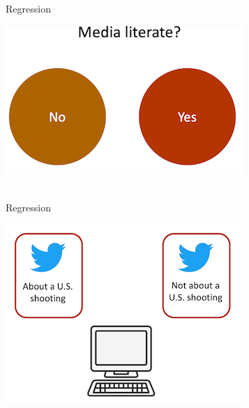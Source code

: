 \documentclass[handout]{beamer}
\begin{document}
\begin{frame}{Regression}
	
	\begin{center}
		\includegraphics{../pictures/medialiteracydummy.png} \\\
	\end{center}
	
	
	
	
	
\end{frame}


\begin{frame}{Regression}
	
	\begin{center}
		\includegraphics{../pictures/Zhangetal_1.png} \\\
	\end{center}
	
	\begin{tiny}
	\end{tiny}
	
	
	
\end{frame}
\end{document}

